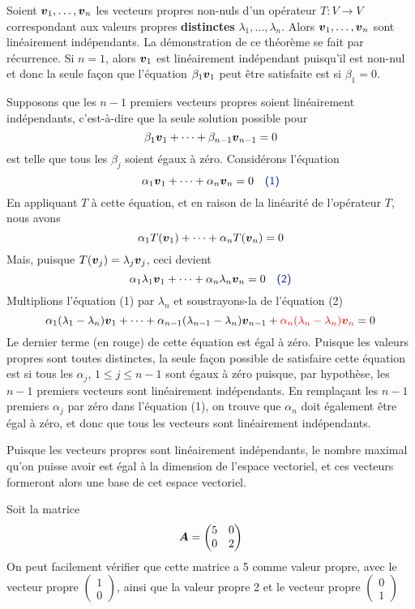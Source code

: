 \begin{theo}
Soient $\boldsymbol{v}_1, \ldots, \boldsymbol{v}_n$ les vecteurs propres non-nuls d'un opérateur $T: V \rightarrow V$ correspondant aux valeurs propres \textbf{distinctes} $\lambda_1, \ldots, \lambda_n$. Alors $\boldsymbol{v}_1, \ldots, \boldsymbol{v}_n$ sont linéairement indépendants.
\proof
La démonstration de ce théorème se fait par récurrence.  Si $n=1$, alors $\boldsymbol{v}_1$ est
linéairement indépendant puisqu'il est non-nul et donc la seule façon que l'équation
$\beta_1 \boldsymbol{v}_1$ peut être satisfaite est si $\beta_1=0$.

Supposons que les $n-1$ premiers vecteurs propres soient linéairement indépendants, 
c'est-à-dire que la seule solution possible pour
\[
\beta_1\boldsymbol{v}_1 + \cdots + \beta_{n-1}\boldsymbol{v}_{n-1} = 0 
\]
est telle que tous les $\beta_j$ soient égaux à zéro.  Considérons l'équation
\[
\alpha_1\mat{v}_1 + \cdots + \alpha_{n}\mat{v}_{n} = 0 \quad \explain{\normalsize (1)}
\]
En appliquant $T$ à cette équation, et en raison de la linéarité de l'opérateur $T$, nous avons
\[
\alpha_1T(\boldsymbol{v}_1) + \cdots + \alpha_nT(\boldsymbol{v}_n) = 0
\]
Mais, puisque $T(\boldsymbol{v}_j) = \lambda_j\boldsymbol{v}_j$, ceci devient
\[
\alpha_1\lambda_1\mat{v}_1 + \cdots + \alpha_n\lambda_n\mat{v}_n = 0 \quad \explain{\normalsize (2)}
\]
Multiplions l'équation (1) par $\lambda_n$ et soustrayons-la de l'équation (2)
\[
\alpha_1(\lambda_1-\lambda_n)\boldsymbol{v}_1 + \cdots + \alpha_{n-1}(\lambda_{n-1}-\lambda_n)\boldsymbol{v}_{n-1} + {\color{red}\alpha_n(\lambda_n-\lambda_n)\boldsymbol{v}_n } = 0
\]
Le dernier terme (en rouge) de cette équation est égal à zéro.
Puisque les valeurs propres sont toutes distinctes, la seule façon possible de satisfaire
cette équation est si tous les $\alpha_j$, $1\leq j \leq n-1$ sont égaux à zéro 
puisque, par hypothèse, les $n-1$ premiers vecteurs sont linéairement indépendants.  
En remplaçant les $n-1$ premiers $\alpha_j$ par
zéro dans l'équation (1), on trouve que $\alpha_n$ doit également être égal à zéro, et donc que
tous les vecteurs sont linéairement indépendants.
\end{theo}

Puisque les vecteurs propres sont linéairement indépendants, le nombre maximal qu'on
puisse avoir est égal à la dimension de l'espace vectoriel, et ces vecteurs
formeront alors une base de cet espace vectoriel.

\begin{exemple}
Soit la matrice 
\[
\boldsymbol{A} = \begin{pmatrix}
5 & 0 \\ 0 & 2
\end{pmatrix}
\]
On peut facilement vérifier que cette matrice a 5 comme valeur propre, avec le vecteur propre $\displaystyle \begin{pmatrix}
1\\0
\end{pmatrix}$, 
ainsi que la valeur propre 2 et le vecteur propre 
$\displaystyle \begin{pmatrix}
0\\1
\end{pmatrix}
$
\end{exemple}

